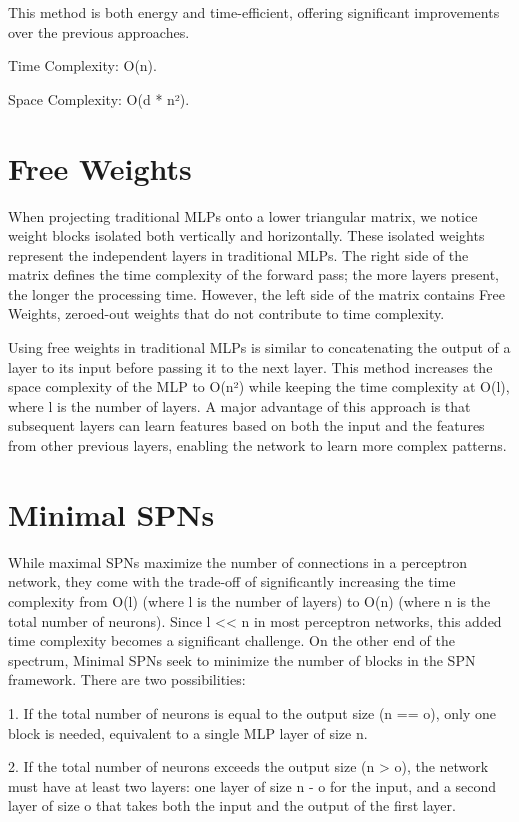 This method is both energy and time-efficient, offering significant improvements over the previous approaches.

Time Complexity: O(n).

Space Complexity: O(d * n²).

\section{Free Weights}

When projecting traditional MLPs onto a lower triangular matrix, we notice weight blocks isolated both vertically and horizontally. These isolated weights represent the independent layers in traditional MLPs. The right side of the matrix defines the time complexity of the forward pass; the more layers present, the longer the processing time. However, the left side of the matrix contains Free Weights, zeroed-out weights that do not contribute to time complexity.
 
Using free weights in traditional MLPs is similar to concatenating the output of a layer to its input before passing it to the next layer. This method increases the space complexity of the MLP to O(n²) while keeping the time complexity at O(l), where l is the number of layers. A major advantage of this approach is that subsequent layers can learn features based on both the input and the features from other previous layers, enabling the network to learn more complex patterns.

\section{Minimal SPNs}

While maximal SPNs maximize the number of connections in a perceptron network, they come with the trade-off of significantly increasing the time complexity from O(l) (where l is the number of layers) to O(n) (where n is the total number of neurons). Since l << n in most perceptron networks, this added time complexity becomes a significant challenge.
On the other end of the spectrum, Minimal SPNs seek to minimize the number of blocks in the SPN framework. There are two possibilities:

1.	If the total number of neurons is equal to the output size (n == o), only one block is needed, equivalent to a single MLP layer of size n.

2.	If the total number of neurons exceeds the output size (n > o), the network must have at least two layers: one layer of size n - o for the input, and a second layer of size o that takes both the input and the output of the first layer.
 
